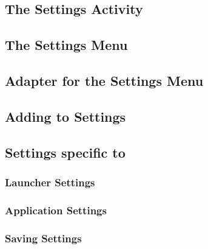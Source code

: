 \subsection{The Settings Activity}\label{sec:sprint3:settings}


\subsection{The Settings Menu}\label{sec:settingslistfragment}


\subsection{Adapter for the Settings Menu}\label{sec:settingslistadapter}


\subsection{Adding to Settings}


\subsection{Settings specific to \launcher}


\subsubsection{Launcher Settings}


\subsubsection{Application Settings}


\subsubsection{Saving Settings}\label{para:sprint4:managingsettingsandroid}

